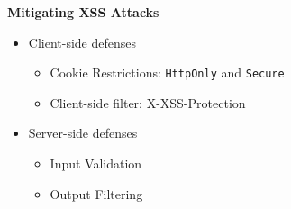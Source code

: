 \documentclass{article}
\begin{document}
\textbf{Mitigating XSS Attacks}
\begin{itemize}
    \item Client-side defenses
    \begin{itemize}
        \item Cookie Restrictions: \verb|HttpOnly| and \verb|Secure|
        \item Client-side filter: X-XSS-Protection
    \end{itemize}
    \item Server-side defenses
    \begin{itemize}
        \item Input Validation
        \item Output Filtering
    \end{itemize}
\end{itemize}
\end{document}
